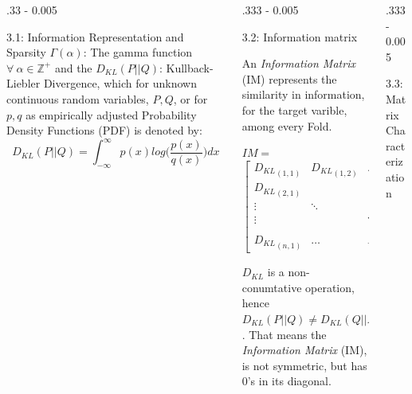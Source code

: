 \documentclass{postertheme}\usepackage[]{graphicx}\usepackage[]{color}
\begin{document}
\begin{frame}
\begin{columns}[onlytextwidth]
\begin{column}{.33 \textwidth - 0.005 \textwidth}
\begin{block}{3.1: Information Representation and Sparsity}
    $\Gamma(\alpha)$: The gamma function $\forall \ \alpha \in \mathbb{Z}^+$ and the
    $D_{KL}(P \vert\vert Q)$: Kullback-Liebler Divergence, which for unknown continuous random variables,
    $P, Q$, or for $p, q$ as empirically adjusted Probability Density Functions (PDF) is denoted by:
    \begin{equation}
        D_{KL}(P \vert\vert Q) = \int_{-\infty}^{\infty} p(x) log \Big( \frac{p(x)}{q(x)} \Big) dx 
    \end{equation}

    \end{block}
  \end{column}
  
  \begin{column}{.333 \textwidth - 0.005 \textwidth}
    \begin{block}{3.2: Information matrix \footnotesize } \footnotesize
        
        An \textit{Information Matrix} (IM) represents the similarity in information, for the target varible,
        among every Fold.
        
      \begin{center}
          $IM=$
          $\begin{bmatrix}
            {D_{KL}}_{(1, 1)} & {D_{KL}}_{(1, 2)} & \hdots            & {D_{KL}}_{(1, n)}    \\
            {D_{KL}}_{(2, 1)} &                   &                   & \vdots               \\
            \vdots            & \ddots            &                   & \vdots               \\
            \vdots            &                   & \ddots            & {D_{KL}}_{(n-1, n)}  \\
            {D_{KL}}_{(n, 1)} & \hdots            & {D_{KL}}_{(n, n-1)} & {D_{KL}}_{(n, n)}
          \end{bmatrix}$
      \end{center}
      
      $D_{KL}$ is a non-conumtative operation, hence $D_{KL}(P \vert \vert Q) \neq D_{KL}(Q \vert \vert P)$. 
      That means the \textit{Information Matrix} (IM), is not symmetric, but has 0's in its diagonal.
        
    \end{block}
  \end{column}

  \begin{column}{.333 \textwidth - 0.005 \textwidth}
    \begin{block}{3.3: Matrix Characterization } \footnotesize
        

\end{block}
\end{column}
\end{columns}
\end{frame}
\end{document}
